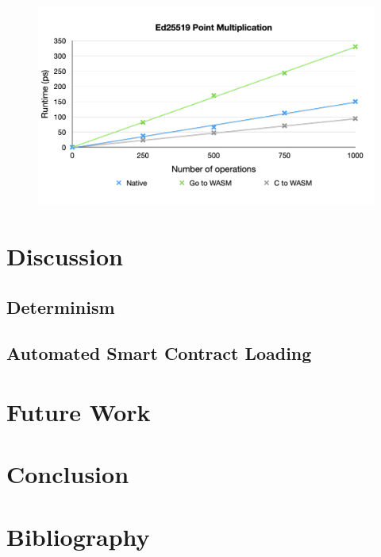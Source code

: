 \documentclass[11pt, a4paper, twoside, openright]{article}
\begin{document}
\begin{figure}[H]
 \centering
  \includegraphics[width=14cm]{point_mul.png}
\end{figure}



\section{Discussion}

\subsection{Determinism}

\subsection{Automated Smart Contract Loading}


\section{Future Work}

\section{Conclusion}
\newpage
\section{Bibliography}


\end{document}
